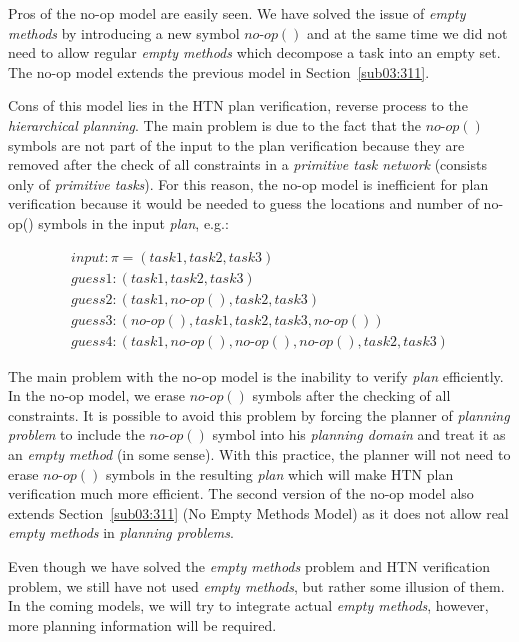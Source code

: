 \medskip\noindent
Pros of the no-op model are easily seen. We have solved the issue of \emph{empty methods} by introducing a new symbol $no\text{-}op()$ and at the same time we did not need to allow regular \emph{empty methods} which decompose a task into an empty set. The no-op model extends the previous model in Section~\ref{sub03:311}.

\medskip\noindent
Cons of this model lies in the HTN plan verification, reverse process to the \emph{hierarchical planning}. The main problem is due to the fact that the $no\text{-}op()$ symbols are not part of the input to the plan verification because they are removed after the check of all constraints in a \emph{primitive task network} (consists only of \emph{primitive tasks}). For this reason, the no-op model is inefficient for plan verification because it would be needed to guess the locations and number of no-op() symbols in the input \emph{plan}, e.g.:

\begin{gather*}
    input: \pi = (task1, task2, task3) \\
    guess 1: (task1, task2, task3) \\
    guess 2: (task1, no\text{-}op(), task2, task3) \\
    guess 3: (no\text{-}op(), task1, task2, task3, no\text{-}op()) \\
    guess 4: (task1, no\text{-}op(), no\text{-}op(), no\text{-}op(), task2, task3)
\end{gather*}

\medskip\noindent
The main problem with the no-op model is the inability to verify \emph{plan} efficiently. In the no-op model, we erase $no\text{-}op()$ symbols after the checking of all constraints. It is possible to avoid this problem by forcing the planner of \emph{planning problem} to include the $no\text{-}op()$ symbol into his \emph{planning domain} and treat it as an \emph{empty method} (in some sense). With this practice, the planner will not need to erase $no\text{-}op()$ symbols in the resulting \emph{plan} which will make HTN plan verification much more efficient. The second version of the no-op model also extends Section~\ref{sub03:311} (No Empty Methods Model) as it does not allow real \emph{empty methods} in \emph{planning problems}.

\medskip\noindent
Even though we have solved the \emph{empty methods} problem and HTN verification problem, we still have not used \emph{empty methods}, but rather some illusion of them. In the coming models, we will try to integrate actual \emph{empty methods}, however, more planning information will be required.

